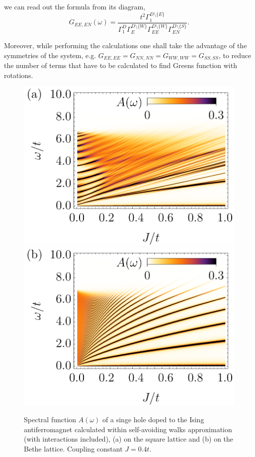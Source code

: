 \documentclass[11pt, a4paper, twocolumn]{article}
\begin{document}
we can read out the formula from its diagram,
\begin{equation}
	G_{EE,EN}(\omega) = \frac{
	t^2\Gamma_1^{D \setminus \{E\}}
	}
	{
		\Gamma_1^{D}
		\Gamma_E^{D \setminus \{W\}}
		\Gamma_{EE}^{D \setminus \{W\}}
		\Gamma_{EN}^{D \setminus \{S\}}
	}.
\end{equation}

Moreover, while performing the calculations one shall take the advantage of the symmetries of the system, e.g. $G_{EE,EE} = G_{NN,NN} = G_{WW,WW} = G_{SS,SS}$, to reduce the number of terms that have to be calculated to find Greens function with rotations.

\clearpage

\begin{figure}[ht!]
	\includegraphics[width=0.49\columnwidth]
	{./figures/square/Int64[].png}
	\includegraphics[width=0.49\columnwidth]
	{./figures/bethe/Int64[].png}
	\caption{
		Spectral function $A(\omega)$ of a singe hole doped to the Ising antiferromagnet calculated within self-avoiding walks approximation (with interactions included), (a) on the square lattice and (b) on the Bethe lattice. Coupling constant $J=0.4t$.
	}
\end{figure}
\end{document}
